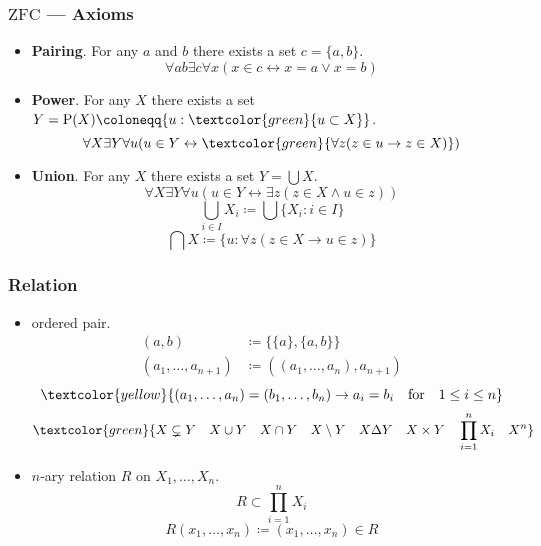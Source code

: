 \documentclass[UTF8,aspectratio=43,11pt,colorlinks,compress,openany]{beamer}%
\begin{document}
\begin{frame}\frametitle{$\mathrm{ZFC}$ --- Axioms}
	\begin{itemize}
		\item \textbf{Pairing}. For any $a$ and $b$ there exists a set $c=\{a,b\}$.
		\[\forall ab\exists c\forall x(x\in c\leftrightarrow x=a\vee x=b)\]
		\item \textbf{Power}. For any $X$ there exists a set $Y=\operatorname{P}(X)\coloneqq \{u: \textcolor{green}{u\subset X}\}$.
		\[\forall X\exists Y\forall u(u\in Y\leftrightarrow\textcolor{green}{\forall z(z\in u\to z\in X)})\]
		\item \textbf{Union}. For any $X$ there exists a set $Y=\bigcup X$.
		\[\forall X\exists Y\forall u(u\in Y\leftrightarrow\exists z(z\in X\wedge u\in z))\]
		\[\bigcup\limits_{i\in I}X_i\coloneqq \bigcup\{X_i: i\in I\}\]
		\[\bigcap X\coloneqq \{u: \forall z(z\in X\to u\in z)\}\]
	\end{itemize}
\end{frame}

\begin{frame}\frametitle{Relation}
	\begin{itemize}
		\item ordered pair.
		\begin{align*}
		(a,b)&\coloneqq \{\{a\},\{a,b\}\}\\
		(a_1,\dots,a_{n+1})&\coloneqq ((a_1,\dots,a_n),a_{n+1})
		\end{align*}
		\[\textcolor{yellow}{(a_1,\dots,a_n)=(b_1,\dots,b_n)\to a_i=b_i\quad\text{for}\quad 1\leq i\leq n}\]
		\[\textcolor{green}{X\subsetneq Y\quad X\cup Y\quad X\cap Y\quad X\setminus Y\quad X\Delta Y\quad X\times Y\quad\prod\limits_{i=1}^n X_i\quad X^n}\]
		\item $n$-ary relation $R$ on $X_1,\dots,X_n$. \[R\subset\prod\limits_{i=1}^n X_i\]
		\[R(x_1,\dots,x_n)\coloneqq (x_1,\dots,x_n)\in R\]
	\end{itemize}
\end{frame}
\end{document}
